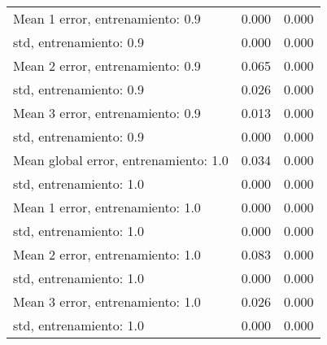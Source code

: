 \begin{longtable}{p{4cm}|p{1.5cm}|p{1.5cm}}
Mean 1 error, entrenamiento: 0.9      &              0.000 &        0.000 \\
std, entrenamiento: 0.9               &              0.000 &        0.000 \\
Mean 2 error, entrenamiento: 0.9      &              0.065 &        0.000 \\
std, entrenamiento: 0.9               &              0.026 &        0.000 \\
Mean 3 error, entrenamiento: 0.9      &              0.013 &        0.000 \\
std, entrenamiento: 0.9               &              0.000 &        0.000 \\
Mean global error, entrenamiento: 1.0 &              0.034 &        0.000 \\
std, entrenamiento: 1.0               &              0.000 &        0.000 \\
Mean 1 error, entrenamiento: 1.0      &              0.000 &        0.000 \\
std, entrenamiento: 1.0               &              0.000 &        0.000 \\
Mean 2 error, entrenamiento: 1.0      &              0.083 &        0.000 \\
std, entrenamiento: 1.0               &              0.000 &        0.000 \\
Mean 3 error, entrenamiento: 1.0      &              0.026 &        0.000 \\
std, entrenamiento: 1.0               &              0.000 &        0.000 \\
\end{longtable}
